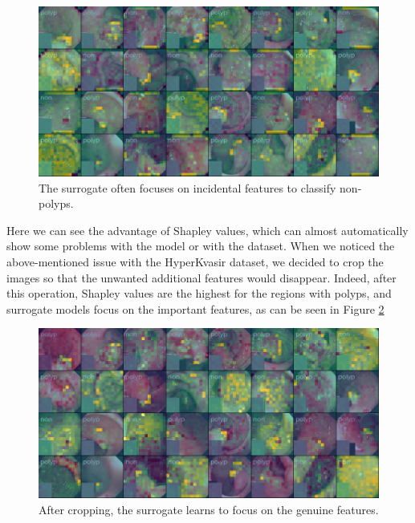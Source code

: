 \documentclass[magisterska,en]{pracamgr}
\begin{document}
\begin{figure}[H]
\centering
\includegraphics[scale=0.5]{./images/shap_gastro_edges.png}
\caption{The surrogate often focuses on incidental features to classify non-polyps.}
\label{Shapley values gastro}
\end{figure}




Here we can see the advantage of Shapley values, which can almost automatically show some problems with the model or with the dataset.
When we noticed the above-mentioned issue with the HyperKvasir dataset, we decided to crop the images so that the unwanted additional features would disappear. Indeed, after this operation, Shapley values are the highest for the regions with polyps, and surrogate models focus on the important features, as can be seen in Figure
\ref{Shapley values for 196 players cropped gastro}

\begin{figure}[H]
\centering
\includegraphics[scale=0.5]{./images/cropped_shap_gastro.png}
\caption{After cropping, the surrogate learns to focus on the genuine features.}
\label{Shapley values for 196 players cropped gastro}
\end{figure}
\end{document}
